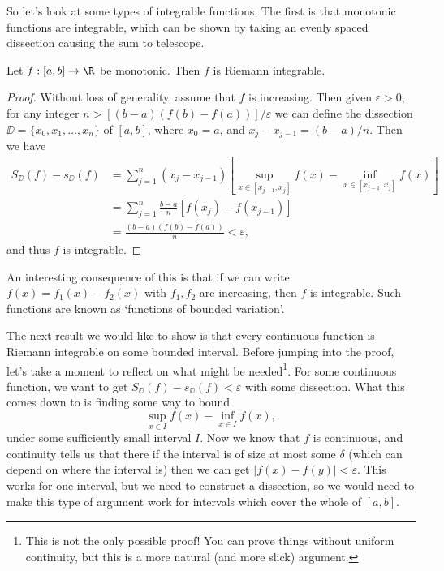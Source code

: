 So let's look at some types of integrable functions. The first is that monotonic functions are integrable, which can be shown by taking an evenly spaced dissection causing the sum to telescope.

\begin{proposition}
	Let $f:[a, b] \rightarrow \R$ be monotonic. Then $f$ is Riemann integrable.
\end{proposition}
\begin{proof}
	Without loss of generality, assume that $f$ is increasing. Then given $\varepsilon > 0$, for any integer $n > [(b - a)(f(b)- f(a))]/\varepsilon$ we can define the dissection $\DD = \{x_0, x_1, \dots, x_n\}$ of $[a, b]$, where $x_0 = a$, and $x_{j} - x_{j - 1} = (b - a)/n$. Then we have
	\begin{align*}
		S_{\DD}(f) - s_{\DD}(f) &= \sum_{j = 1}^n (x_{j} - x_{j - 1})\left[\sup_{x \in [x_{j - 1}, x_j]} f(x) - \inf_{x \in [x_{j - 1}, x_j]} f(x)\right] \\
&= \sum_{j = 1}^n \frac{b - a}{n}\left[f(x_j) - f(x_{j - 1})\right] \\
&= \frac{(b - a)(f(b) - f(a))}{n} < \varepsilon,
	\end{align*}
	and thus $f$ is integrable.
\end{proof}

An interesting consequence of this is that if we can write $f(x) = f_1(x) - f_2(x)$ with $f_1, f_2$ are increasing, then $f$ is integrable. Such functions are known as `functions of bounded variation'. 

The next result we would like to show is that every continuous function is Riemann integrable on some bounded interval. Before jumping into the proof, let's take a moment to reflect on what might be needed\footnote{This is not the only possible proof! You can prove things without uniform continuity, but this is a more natural (and more slick) argument.}. For some continuous function, we want to get $S_{\DD}(f) - s_{\DD}(f) < \varepsilon$ with some dissection. What this comes down to is finding some way to bound
$$
\sup_{x \in I}f(x) - \inf_{x \in I} f(x),
$$
under some sufficiently small interval $I$. 
Now we know that $f$ is continuous, and continuity tells us that there if the interval is of size at most some $\delta$ (which can depend on where the interval is) then we can get $|f(x) - f(y)| < \varepsilon$. 
This works for one interval, but we need to construct a dissection, so we would need to make this type of argument work for intervals which cover the whole of $[a, b]$.

